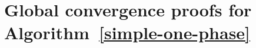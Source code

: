 \documentclass{article}
\begin{document}
\appendix

%
%
%
%

\section{Global convergence proofs for Algorithm~\ref{simple-one-phase}}\label{app:global-conv}
\end{document}

